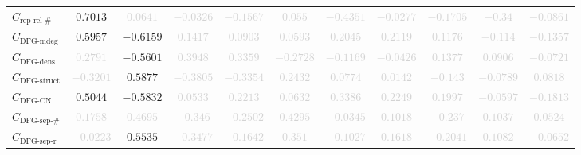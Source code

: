 \documentclass{standalone}
\newcommand{\reprelnumname}{\text{rep-rel-\#}}
\newcommand{\reprelnum}{C_{\reprelnumname}}
\newcommand{\dfgmaxdegname}{\text{DFG-mdeg}}
\newcommand{\dfgmaxdeg}{C_{\dfgmaxdegname}}
\newcommand{\dfgdensname}{\text{DFG-dens}}
\newcommand{\dfgdens}{C_{\dfgdensname}}
\newcommand{\dfgstructname}{\text{DFG-struct}}
\newcommand{\dfgstruct}{C_{\dfgstructname}}
\newcommand{\dfgcycnumbername}{\text{DFG-CN}}
\newcommand{\dfgcycnumber}{C_{\dfgcycnumbername}}
\newcommand{\dfgsepnumname}{\text{DFG-sep-\#}}
\newcommand{\dfgsepnum}{C_{\dfgsepnumname}}
\newcommand{\dfgseprationame}{\text{DFG-sep-r}}
\newcommand{\dfgsepratio}{C_{\dfgseprationame}}
\begin{document}
\begin{tabular}{lcccccccccc}
$\reprelnum$ & $0.7013$ & \textcolor{lightgray}{$0.0641$} & \textcolor{lightgray}{$-0.0326$} & \textcolor{lightgray}{$-0.1567$} & \textcolor{lightgray}{$0.055$} & \textcolor{lightgray}{$-0.4351$} & \textcolor{lightgray}{$-0.0277$} & \textcolor{lightgray}{$-0.1705$} & \textcolor{lightgray}{$-0.34$} & \textcolor{lightgray}{$-0.0861$} \\ 
$\dfgmaxdeg$ & $0.5957$ & $-0.6159$ & \textcolor{lightgray}{$0.1417$} & \textcolor{lightgray}{$0.0903$} & \textcolor{lightgray}{$0.0593$} & \textcolor{lightgray}{$0.2045$} & \textcolor{lightgray}{$0.2119$} & \textcolor{lightgray}{$0.1176$} & \textcolor{lightgray}{$-0.114$} & \textcolor{lightgray}{$-0.1357$} \\ 
$\dfgdens$ & \textcolor{lightgray}{$0.2791$} & $-0.5601$ & \textcolor{lightgray}{$0.3948$} & \textcolor{lightgray}{$0.3359$} & \textcolor{lightgray}{$-0.2728$} & \textcolor{lightgray}{$-0.1169$} & \textcolor{lightgray}{$-0.0426$} & \textcolor{lightgray}{$0.1377$} & \textcolor{lightgray}{$0.0906$} & \textcolor{lightgray}{$-0.0721$} \\ 
$\dfgstruct$ & \textcolor{lightgray}{$-0.3201$} & $0.5877$ & \textcolor{lightgray}{$-0.3805$} & \textcolor{lightgray}{$-0.3354$} & \textcolor{lightgray}{$0.2432$} & \textcolor{lightgray}{$0.0774$} & \textcolor{lightgray}{$0.0142$} & \textcolor{lightgray}{$-0.143$} & \textcolor{lightgray}{$-0.0789$} & \textcolor{lightgray}{$0.0818$} \\ 
$\dfgcycnumber$ & $0.5044$ & $-0.5832$ & \textcolor{lightgray}{$0.0533$} & \textcolor{lightgray}{$0.2213$} & \textcolor{lightgray}{$0.0632$} & \textcolor{lightgray}{$0.3386$} & \textcolor{lightgray}{$0.2249$} & \textcolor{lightgray}{$0.1997$} & \textcolor{lightgray}{$-0.0597$} & \textcolor{lightgray}{$-0.1813$} \\ 
$\dfgsepnum$ & \textcolor{lightgray}{$0.1758$} & \textcolor{lightgray}{$0.4695$} & \textcolor{lightgray}{$-0.346$} & \textcolor{lightgray}{$-0.2502$} & \textcolor{lightgray}{$0.4295$} & \textcolor{lightgray}{$-0.0345$} & \textcolor{lightgray}{$0.1018$} & \textcolor{lightgray}{$-0.237$} & \textcolor{lightgray}{$0.1037$} & \textcolor{lightgray}{$0.0524$} \\ 
$\dfgsepratio$ & \textcolor{lightgray}{$-0.0223$} & $0.5535$ & \textcolor{lightgray}{$-0.3477$} & \textcolor{lightgray}{$-0.1642$} & \textcolor{lightgray}{$0.351$} & \textcolor{lightgray}{$-0.1027$} & \textcolor{lightgray}{$0.1618$} & \textcolor{lightgray}{$-0.2041$} & \textcolor{lightgray}{$0.1082$} & \textcolor{lightgray}{$-0.0652$} \\ 

\end{tabular}
\end{document}

